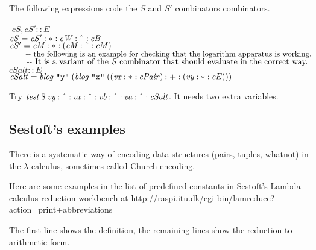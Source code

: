 \documentclass{article}
\newlength{\lwidth}\setlength{\lwidth}{4.5cm}
\newlength{\cwidth}\setlength{\cwidth}{8mm} %
\newcommand{\Conid}[1]{\mathit{#1}}
\newcommand{\Varid}[1]{\mathit{#1}}
\begin{document}
The following expressions code the \ensuremath{\Conid{S}} and \ensuremath{\Conid{S'}} combinators
combinators.
\begin{tabbing}
\qquad\=\hspace{\lwidth}\=\hspace{\cwidth}\=\+\kill
${\Varid{cS},\Varid{cS'}\mathbin{::}\Conid{E}}$\\
${\Varid{cS}\mathrel{=}\Varid{cS'}\mathbin{:*:}\Varid{cW}\mathbin{:\char94 :}\Varid{cB}}$\\
${\Varid{cS'}\mathrel{=}\Varid{cM}\mathbin{:*:}(\Varid{cM}\mathbin{:\char94 :}\Varid{cM})}$\\
${}$\\
${\mbox{\qquad-{}-  the following is an example for checking that the logarithm apparatus is working.}}$\\
${\mbox{\qquad-{}-  It is a variant of the \ensuremath{\Conid{S}} combinator that should evaluate in the correct way. }}$\\
${\Varid{cSalt}\mathbin{::}\Conid{E}}$\\
${\Varid{cSalt}\mathrel{=}\Varid{blog}\;\text{\ttfamily \char34 y\char34}\;(\Varid{blog}\;\text{\ttfamily \char34 x\char34}\;((\Varid{vx}\mathbin{:*:}\Varid{cPair})\mathbin{:+:}(\Varid{vy}\mathbin{:*:}\Varid{cE})))}$
\end{tabbing}Try \ensuremath{\Varid{test}\mathbin{\$}\Varid{vy}\mathbin{:\char94 :}\Varid{vx}\mathbin{:\char94 :}\Varid{vb}\mathbin{:\char94 :}\Varid{va}\mathbin{:\char94 :}\Varid{cSalt}}. It needs two extra variables.

\subsection{Sestoft's examples}

There is a systematic way of encoding data structures (pairs, tuples, whatnot) in the $\lambda$-calculus,
sometimes called Church-encoding.

Here are some examples in the list of predefined constants in 
Sestoft's Lambda calculus reduction workbench at 
http://raspi.itu.dk/cgi-bin/lamreduce?action=print+abbreviations

The first line shows the definition, the remaining lines show
the reduction to arithmetic form.
\end{document}
